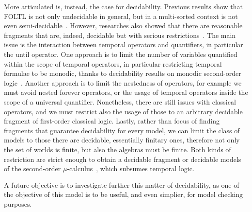More articulated is, instead, the case for decidability. Previous results show that \ac{FOLTL} is not only undecidable
in general, but in a multi-sorted context is not even semi-decidable~\cite{merz_decidability_1992}. However, researches
also showed that there are reasonable fragments that are, indeed, decidable but with serious
restrictions~\cite{hodkinson_decidable_2000,hodkinson_decidable_2002,goos_monodic_2001,peyras_decidable_2020,peyras_bounded_2019}.
The main issue is the interaction between temporal operators and quantifiers, in particular the until operator. One
approach is to limit the number of variables quantified within the scope of temporal operators, in particular
restricting temporal formulae to be monodic, thanks to decidability results on monodic second-order
logic~\cite{rozenberg_expression_1997}. Another approach is to limit the nestedness of operators, for example we must
avoid nested forever operators, or the usage of temporal operators inside the scope of a universal quantifier.
Nonetheless, there are still issues with classical operators, and we must restrict also the usage of those to an
arbitrary decidable fragment of first-order classical logic. Lastly, rather than focus of finding fragments that
guarantee decidability for every model, we can limit the class of models to those there are decidable, essentially
finitary ones, therefore not only the set of worlds is finite, but also the algebras must be finite. Both kinds of
restriction are strict enough to obtain a decidable fragment or decidable models of the second-order
$\mu$-calculus~\cite{hutchison_counterpart_2010}, which subsumes temporal logic.

A future objective is to investigate further this matter of decidability, as one of the objective of this model is to be
useful, and even simplier, for model checking purposes.
